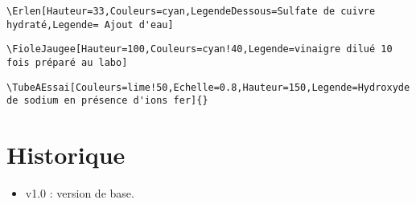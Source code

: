 \documentclass[a4paper,12pt,dvipsnames]{report}
\begin{document}
\begin{center}
\Erlen[Hauteur=33,Couleurs=cyan,LegendeDessous=Sulfate de cuivre hydraté,Legende= Ajout d'eau]

\begin{lstlisting}[style=A]
\Erlen[Hauteur=33,Couleurs=cyan,LegendeDessous=Sulfate de cuivre hydraté,Legende= Ajout d'eau]

\end{lstlisting}

\FioleJaugee[Hauteur=100,Couleurs=cyan!40,Legende=vinaigre dilué 10 fois préparé au labo]

\begin{lstlisting}[style=A]
\FioleJaugee[Hauteur=100,Couleurs=cyan!40,Legende=vinaigre dilué 10 fois préparé au labo]

\end{lstlisting}
    
\TubeAEssai[Couleurs=lime!50,Echelle=0.8,Hauteur=150,Legende=Hydroxyde de sodium en présence d'ions fer]{}
\begin{lstlisting}[style=A]
\TubeAEssai[Couleurs=lime!50,Echelle=0.8,Hauteur=150,Legende=Hydroxyde de sodium en présence d'ions fer]{}
\end{lstlisting}


\chapter{Historique}
\thispagestyle{fancy}

\begin{itemize}

\item v1.0 : version de base.
\end{itemize}


\end{center}
\end{document}
